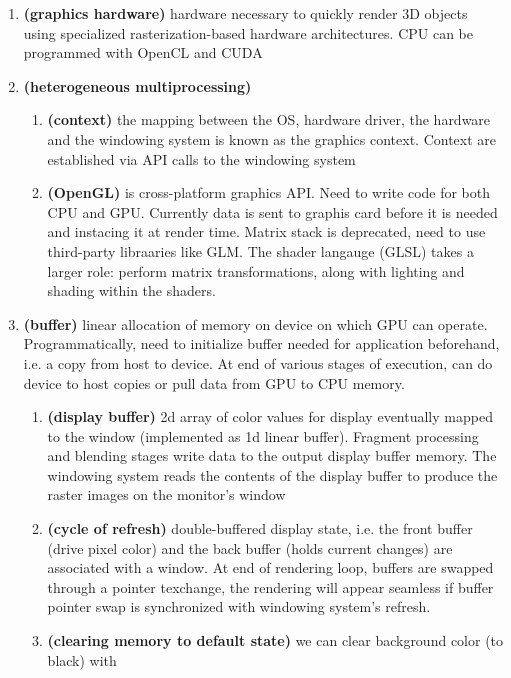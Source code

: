 \documentclass[11pt]{article}
\newcommand{\bheading}[1]{\textbf{(#1)}}
\begin{document}
\begin{enumerate}
    \item \bheading{graphics hardware} hardware necessary to quickly render 3D objects using specialized rasterization-based hardware architectures. CPU can be programmed with OpenCL and CUDA
    \item \bheading{heterogeneous multiprocessing} 
    \begin{enumerate}
        \item \bheading{context} the mapping between the OS, hardware driver, the hardware and the windowing system is known as the graphics context. Context are established via API calls to the windowing system
        \item \bheading{OpenGL} is cross-platform graphics API. Need to write code for both CPU and GPU. Currently data is sent to graphis card before it is needed and instacing it at render time.  Matrix stack is deprecated, need to use third-party libraaries like GLM. The shader langauge (GLSL) takes a larger role: perform matrix transformations, along with lighting and shading within the shaders.
    \end{enumerate}
    \item \bheading{buffer} linear allocation of memory on device on which GPU can operate. Programmatically, need to initialize buffer needed for application beforehand, i.e. a copy from host to device. At end of various stages of execution, can do device to host copies or pull data from GPU to CPU memory.
    \begin{enumerate}
        \item \bheading{display buffer} 2d array of color values for display eventually mapped to the window (implemented as 1d linear buffer). Fragment processing and blending stages write data to the output display buffer memory. The windowing system reads the contents of the display buffer to produce the raster images on the monitor's window
        \item \bheading{cycle of refresh} double-buffered display state, i.e. the front buffer (drive pixel color) and the back buffer (holds current changes) are associated with a window. At end of rendering loop, buffers are swapped through a pointer texchange, the rendering will appear seamless if buffer pointer swap is synchronized with windowing system's refresh. 
        \item \bheading{clearing memory to default state} we can clear background color (to black) with
        \begin{align*}

\end{align*}
\end{enumerate}
\end{enumerate}
\end{document}
